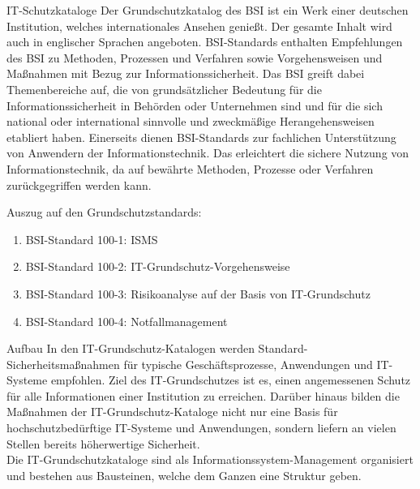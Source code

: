  \label{IT-Schutzkataloge}
 \begin{section}{IT-Schutzkataloge}
	Der Grundschutzkatalog des BSI ist ein Werk einer deutschen Institution, welches 
	internationales Ansehen genießt. Der gesamte Inhalt wird auch in englischer Sprachen 
	angeboten.
	BSI-Standards enthalten Empfehlungen des BSI zu Methoden, Prozessen und Verfahren sowie Vorgehensweisen 
	und Maßnahmen mit Bezug zur Informationssicherheit. 
	Das BSI greift dabei Themenbereiche auf, die von grundsätzlicher Bedeutung für die 
	Informationssicherheit in Behörden oder Unternehmen sind und für die sich national oder 
	international sinnvolle und zweckmäßige Herangehensweisen etabliert haben.
	Einerseits dienen BSI-Standards zur fachlichen Unterstützung von Anwendern der Informationstechnik. 
	Das erleichtert die sichere Nutzung von Informationstechnik, da auf bewährte Methoden, Prozesse 
	oder Verfahren zurückgegriffen werden kann.
  \cite{BSIITkat}
  
  \pagebreak
  Auszug auf den Grundschutzstandards:
  \begin{enumerate}
	\item BSI-Standard 100-1: \ac{ISMS} \\
	\item BSI-Standard 100-2: IT-Grundschutz-Vorgehensweise \\
	\item BSI-Standard 100-3: Risikoanalyse auf der Basis von IT-Grundschutz \\
	\item BSI-Standard 100-4: Notfallmanagement \\
  \end{enumerate}
 \end{section}
 
 \label{Aufbau Grundschutzkataloge}
 \begin{section} {Aufbau}
	In den IT-Grundschutz-Katalogen werden Standard-Sicherheitsmaßnahmen für typische Geschäftsprozesse, 
	Anwendungen und IT-Systeme empfohlen. Ziel des IT-Grundschutzes ist es, 
	einen angemessenen Schutz für alle Informationen einer Institution zu erreichen. 
	Darüber hinaus bilden die Maßnahmen der IT-Grundschutz-Kataloge nicht nur 
	eine Basis für hochschutzbedürftige IT-Systeme und Anwendungen, 
	sondern liefern an vielen Stellen bereits höherwertige Sicherheit. \\
	Die IT-Grundschutzkataloge sind als Informationssystem-Management organisiert und 
	bestehen aus Bausteinen, welche dem Ganzen eine Struktur geben.
 \end{section}
 \pagebreak 
 
